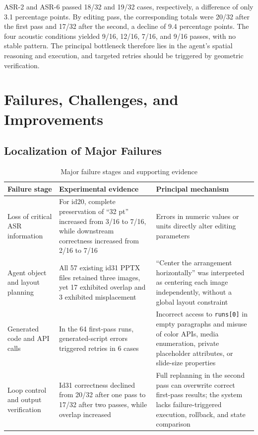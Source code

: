\documentclass[11pt,a4paper,UTF8,fontset=fandol]{ctexart}
\begin{document}
ASR-2 and ASR-6 passed 18/32 and 19/32 cases, respectively, a difference of only 3.1 percentage points. By editing pass, the corresponding totals were 20/32 after the first pass and 17/32 after the second, a decline of 9.4 percentage points. The four acoustic conditions yielded 9/16, 12/16, 7/16, and 9/16 passes, with no stable pattern. The principal bottleneck therefore lies in the agent's spatial reasoning and execution, and targeted retries should be triggered by geometric verification.

\section{Failures, Challenges, and Improvements}

\subsection{Localization of Major Failures}

\begin{table}[H]
\centering
\caption{Major failure stages and supporting evidence}
\small
\begin{tabularx}{\textwidth}{L{2.7cm} L{5.4cm} Y}
\toprule
Failure stage & Experimental evidence & Principal mechanism \\
\midrule
Loss of critical ASR information & For id20, complete preservation of ``32 pt'' increased from 3/16 to 7/16, while downstream correctness increased from 2/16 to 7/16 & Errors in numeric values or units directly alter editing parameters \\
Agent object and layout planning & All 57 existing id31 PPTX files retained three images, yet 17 exhibited overlap and 3 exhibited misplacement & ``Center the arrangement horizontally'' was interpreted as centering each image independently, without a global layout constraint \\
Generated code and API calls & In the 64 first-pass runs, generated-script errors triggered retries in 6 cases & Incorrect access to \texttt{runs[0]} in empty paragraphs and misuse of color APIs, media enumeration, private placeholder attributes, or slide-size properties \\
Loop control and output verification & Id31 correctness declined from 20/32 after one pass to 17/32 after two passes, while overlap increased & Full replanning in the second pass can overwrite correct first-pass results; the system lacks failure-triggered execution, rollback, and state comparison \\
\bottomrule
\end{tabularx}
\end{table}
\end{document}
